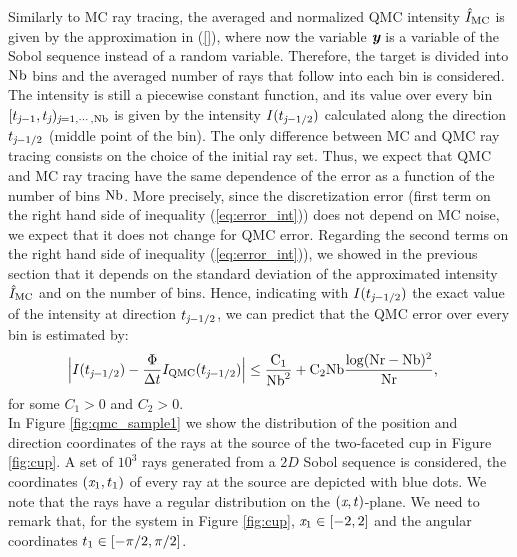 Similarly to MC ray tracing, the averaged and normalized QMC intensity $\hat{I}_{\textrm{MC}}$ is given by the approximation in (\ref{}), where now the variable $\textit{\textbf{y}}$ is a variable of the Sobol sequence instead of a random variable. Therefore, the target is divided into $\textrm{Nb}$ bins and the averaged number of rays that follow into each bin is considered. The intensity is still a piecewise constant function, and its value over every bin $[t_{\textit{j}-1}, t_{\textit{j}})_{\textit{j}=1, \cdots, \textrm{Nb}}$ is given by the intensity $I(t_{\textit{j}-1/2})$ calculated along the direction $t_{\textit{j}-1/2}$ (middle point of the bin). The only difference between MC and QMC ray tracing consists on the choice of the initial ray set. Thus, we expect that QMC and MC ray tracing have the same dependence of the error as a function of the number of bins $\textrm{Nb}$. More precisely, since the discretization error (first term on the right hand side of inequality (\ref{eq:error_int})) does not depend on MC noise, we expect that it does not change for QMC error. Regarding the second terms on the right hand side of inequality (\ref{eq:error_int})), we showed in the previous section that it depends on the standard deviation of the approximated intensity $\hat{I}_{\textrm{MC}}$ and on the number of bins. Hence, indicating with $I(t_{\textit{j}-1/2})$ the exact value of the intensity at direction $t_{\textit{j}-1/2}$, we can predict that the QMC error over every bin is estimated by:
\begin{equation} \begin{aligned}
\Big|I(t_{\textit{j}-1/2})&-\frac{\Phi}
{\Delta t}I_{\textrm{QMC}}(t_{\textit{j}-1/2})\Big| \leq
\frac{\textrm{C}_1}{\textrm{Nb}^2} + \textrm{C}_2\textrm{Nb}\frac{\log(\textrm{Nr}-\textrm{Nb})^2}{\textrm{Nr}},
\end{aligned}
\end{equation}
for some $C_1>0$ and $C_2>0$.
\\ \indent
In Figure \ref{fig:qmc_sample1} we show the distribution of the position and direction coordinates of the rays at the source of the two-faceted cup in Figure \ref{fig:cup}. 
A set of $10^3$ rays generated from a $2D$ Sobol sequence is considered, the coordinates $(\textit{x}_1, t_1)$ of every ray at the source are depicted with blue dots.
We note that the rays have a regular distribution on the $(\textit{x}, t)$-plane.
We need to remark that, for the system in Figure \ref{fig:cup}, $\textit{x}_1 \in[-2,2]$ and the angular coordinates $t_1 \in[-\pi/2, \pi/2]$. 
